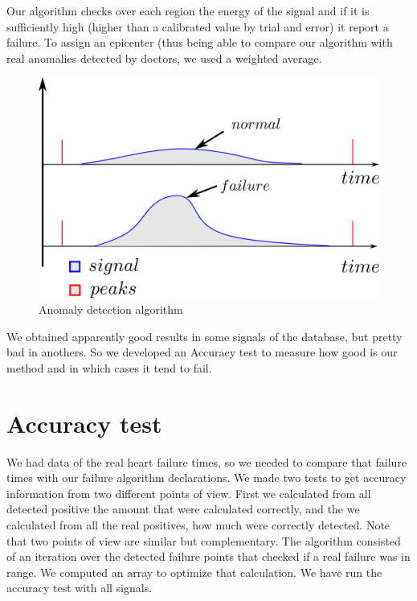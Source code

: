 \documentclass[conference]{IEEEtran}
\begin{document}
Our algorithm checks over each region the energy of the signal and if it is sufficiently high (higher than a calibrated value by trial and error) it report a failure. To assign an epicenter (thus being able to compare our algorithm with real anomalies detected by doctors, we used a weighted average.

\begin{figure}[H]
\centerline{\includegraphics[scale=0.7]{imagenes/anomalyAlgo}}
\caption{Anomaly detection algorithm}
\label{fig}
\end{figure}

We obtained apparently good results in some signals of the database, but pretty bad in anothers. So we developed an Accuracy test to measure how good is our method and in which cases it tend to fail.

\section{Accuracy test}
We had data of the real heart failure times, so we needed to compare that failure times with our failure algorithm declarations. We made two tests to get accuracy information from two different points of view. First we calculated from all detected positive the amount that were calculated correctly, and the we calculated from all the real positives, how much were correctly detected. Note that two points of view are similar but complementary.
The algorithm consisted of an iteration over the detected failure points that checked if a real failure was in range. We computed an array to optimize that calculation.
We have run the accuracy test with all signals.
\end{document}
